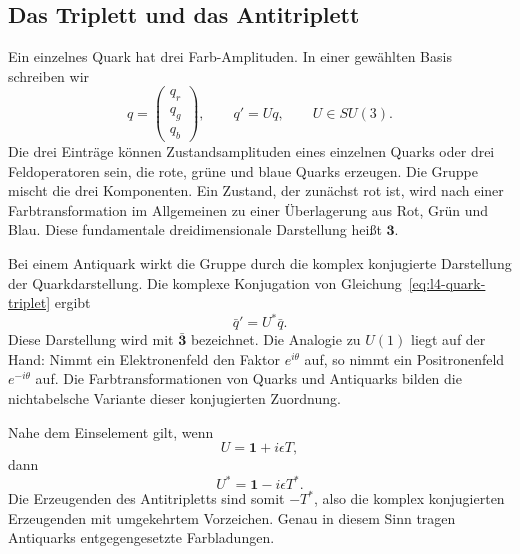 \subsection{Das Triplett und das Antitriplett}

Ein einzelnes Quark hat drei Farb-Amplituden. In einer gewählten Basis schreiben wir
\begin{equation}
q=
\begin{pmatrix}
q_r\\q_g\\q_b
\end{pmatrix},
\qquad
q'=Uq,
\qquad U\in SU(3).
\label{eq:l4-quark-triplet}
\end{equation}
Die drei Einträge können Zustandsamplituden eines einzelnen Quarks oder drei Feldoperatoren sein, die rote, grüne und blaue Quarks erzeugen. Die Gruppe mischt die drei Komponenten. Ein Zustand, der zunächst rot ist, wird nach einer Farbtransformation im Allgemeinen zu einer Überlagerung aus Rot, Grün und Blau. Diese fundamentale dreidimensionale Darstellung heißt \(\boldsymbol 3\).

Bei einem Antiquark wirkt die Gruppe durch die komplex konjugierte Darstellung der Quarkdarstellung. Die komplexe Konjugation von Gleichung~\eqref{eq:l4-quark-triplet} ergibt
\begin{equation}
\bar q'=U^*\bar q.
\end{equation}
Diese Darstellung wird mit \(\bar{\boldsymbol 3}\) bezeichnet. Die Analogie zu \(U(1)\) liegt auf der Hand: Nimmt ein Elektronenfeld den Faktor \(e^{i\theta}\) auf, so nimmt ein Positronenfeld \(e^{-i\theta}\) auf. Die Farbtransformationen von Quarks und Antiquarks bilden die nichtabelsche Variante dieser konjugierten Zuordnung.

Nahe dem Einselement gilt, wenn
\begin{equation}
U=\boldsymbol 1+i\epsilon T,
\end{equation}
dann
\begin{equation}
U^*=\boldsymbol 1-i\epsilon T^*.
\end{equation}
Die Erzeugenden des Antitripletts sind somit \(-T^*\), also die komplex konjugierten Erzeugenden mit umgekehrtem Vorzeichen. Genau in diesem Sinn tragen Antiquarks entgegengesetzte Farbladungen.

\begin{classroomqa}
\end{classroomqa}

